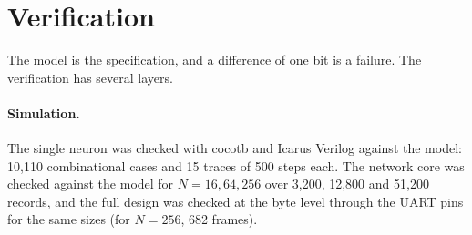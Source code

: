 \documentclass[11pt]{article}
\begin{document}
\section{Verification}
\label{sec:verify}
The model is the specification, and a difference of one bit is a failure.
The verification has several layers.

\paragraph{Simulation.}
The single neuron was checked with cocotb and Icarus Verilog against the model: 10,110 combinational cases and 15 traces of 500 steps each.
The network core was checked against the model for $N=16, 64, 256$ over 3,200, 12,800 and 51,200 records, and the full design was checked at the byte level through the UART pins for the same sizes (for $N=256$, 682 frames).
\end{document}
